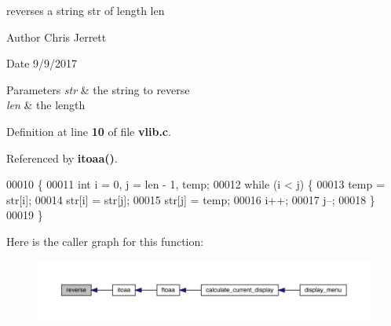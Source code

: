 reverses a string \textquotesingle{}str\textquotesingle{} of length \textquotesingle{}len\textquotesingle{} 

\begin{DoxyAuthor}{Author}
Chris Jerrett 
\end{DoxyAuthor}
\begin{DoxyDate}{Date}
9/9/2017 
\end{DoxyDate}

\begin{DoxyParams}{Parameters}
{\em str} & the string to reverse \\
\hline
{\em len} & the length \\
\hline
\end{DoxyParams}


Definition at line \textbf{ 10} of file \textbf{ vlib.\+c}.



Referenced by \textbf{ itoaa()}.


\begin{DoxyCode}
00010                                  \{
00011   \textcolor{keywordtype}{int} i = 0, j = len - 1, temp;
00012   \textcolor{keywordflow}{while} (i < j) \{
00013     temp = str[i];
00014     str[i] = str[j];
00015     str[j] = temp;
00016     i++;
00017     j--;
00018   \}
00019 \}
\end{DoxyCode}
Here is the caller graph for this function\+:\nopagebreak
\begin{figure}[H]
\begin{center}
\leavevmode
\includegraphics[width=350pt]{vlib_8c_aad7fea725cb4b198ace1aa3df5051244_icgraph}
\end{center}
\end{figure}
